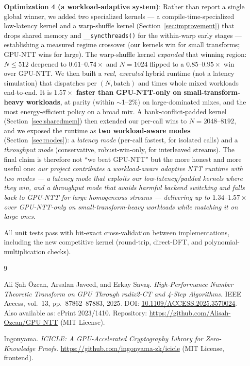 \documentclass[11pt,a4paper]{article}
\begin{document}
\textbf{Optimization 4 (a workload-adaptive system)}: Rather than report a single global winner,
we added two specialized kernels --- a compile-time-specialized low-latency kernel and a
warp-shuffle kernel (Section~\ref{sec:improvement}) that drops shared memory and
\verb|__syncthreads()| for the within-warp early stages --- establishing a measured regime
crossover (our kernels win for small transforms; GPU-NTT wins for large). The warp-shuffle kernel
\emph{expanded} that winning region: $N\le512$ deepened to $0.61$--$0.74\times$ and $N=1024$ flipped
to a $0.85$--$0.95\times$ win over GPU-NTT. We then built a \emph{real, executed} hybrid runtime
(not a latency simulation) that dispatches per $(N,\text{batch})$ and times whole mixed workloads
end-to-end. It is \textbf{$1.57\times$ faster than GPU-NTT-only on small-transform-heavy workloads},
at parity (within $\sim$1--2\%) on large-dominated mixes, and the most energy-efficient policy on a
broad mix. A bank-conflict-padded kernel (Section~\ref{sec:sharedmem}) then extended our per-call
wins to $N{=}2048$--$8192$, and we exposed the runtime as \textbf{two workload-aware modes}
(Section~\ref{sec:modes}): a \emph{latency mode} (per-call fastest, for isolated calls) and a
\emph{throughput mode} (conservative, robust-win-only, for interleaved streams). The final claim is
therefore not ``we beat GPU-NTT'' but the more honest and more useful one: \emph{our project
contributes a workload-aware adaptive NTT runtime with two modes --- a latency mode that exploits our
low-latency/padded kernels where they win, and a throughput mode that avoids harmful backend
switching and falls back to GPU-NTT for large homogeneous streams --- delivering up to
$1.34$--$1.57\times$ over GPU-NTT-only on small-transform-heavy workloads while matching it on
large ones.}

All unit tests pass with bit-exact cross-validation between implementations, including the new
competitive kernel (round-trip, direct-DFT, and polynomial-multiplication checks).

\begin{thebibliography}{9}

Ali Şah Özcan, Arsalan Javeed, and Erkay Savaş.
\textit{High-Performance Number Theoretic Transform on GPU Through radix2-CT and 4-Step Algorithms.}
IEEE Access, vol.~13, pp.~87862--87883, 2025.
DOI: \url{10.1109/ACCESS.2025.3570024}.
Also available as: ePrint 2023/1410.
Repository: \url{https://github.com/Alisah-Ozcan/GPU-NTT} (MIT License).

Ingonyama.
\textit{ICICLE: A GPU-Accelerated Cryptography Library for Zero-Knowledge Proofs.}
\url{https://github.com/ingonyama-zk/icicle} (MIT License, frontend).

\end{thebibliography}
\end{document}
